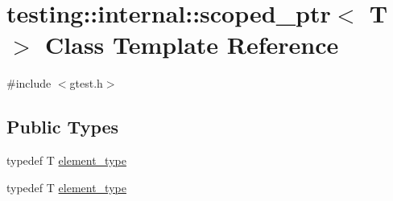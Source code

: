 \hypertarget{classtesting_1_1internal_1_1scoped__ptr}{\section{testing\-:\-:internal\-:\-:scoped\-\_\-ptr$<$ T $>$ Class Template Reference}
\label{classtesting_1_1internal_1_1scoped__ptr}
}


{\ttfamily \#include $<$gtest.\-h$>$}

\subsection*{Public Types}
\begin{DoxyCompactItemize}
\item 
typedef T \hyperlink{classtesting_1_1internal_1_1scoped__ptr_ae755ffeebada8e20b68c1d1ffa91cf13}{element\-\_\-type}
\item 
typedef T \hyperlink{classtesting_1_1internal_1_1scoped__ptr_ae755ffeebada8e20b68c1d1ffa91cf13}{element\-\_\-type}
\end{DoxyCompactItemize}
